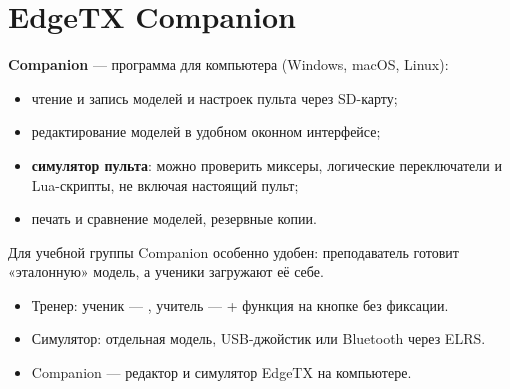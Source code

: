\section{EdgeTX Companion}

\textbf{Companion} --- программа для компьютера (Windows, macOS, Linux):
\begin{itemize}
  \item чтение и запись моделей и настроек пульта через SD-карту;
  \item редактирование моделей в удобном оконном интерфейсе;
  \item \textbf{симулятор пульта}: можно проверить миксеры, логические переключатели и
        Lua-скрипты, не включая настоящий пульт;
  \item печать и сравнение моделей, резервные копии.
\end{itemize}

Для учебной группы Companion особенно удобен: преподаватель готовит «эталонную» модель,
а ученики загружают её себе.

\begin{summary}
\begin{itemize}
  \item Тренер: ученик --- , учитель ---  + функция 
        на кнопке без фиксации.
  \item Симулятор: отдельная модель, USB-джойстик или Bluetooth через ELRS.
  \item Companion --- редактор и симулятор EdgeTX на компьютере.
\end{itemize}
\end{summary}
